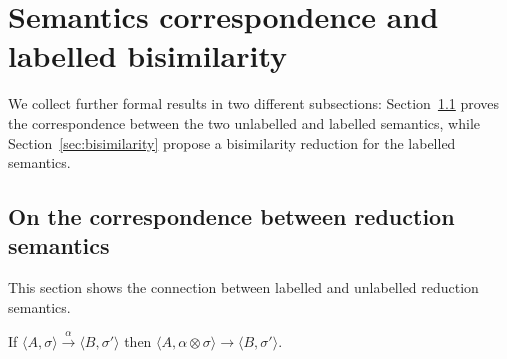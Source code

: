 \documentclass{llncs}
\def\C{{\mathcal C}}
\def\C{{\mathcal C}}
\def\odiv{\, {\ominus\hspace{-7.7pt} \div} \,}
\begin{document}
\section{Semantics correspondence and labelled bisimilarity}\label{sec:correspondancebis}
We collect further formal results in two different subsections: Section~\ref{sec:corres} proves the correspondence between the two unlabelled and labelled semantics, while Section~\ref{sec:bisimilarity} propose a bisimilarity reduction for the labelled  semantics.

\subsection{On the correspondence between reduction semantics}
\label{sec:corres}
This section shows the connection between labelled and unlabelled reduction semantics.
%

\begin{theorem}[Soundness]
\label{sound}
If $\langle A, \sigma \rangle \xrightarrow{\alpha} \langle B, \sigma' \rangle$
then %
$\langle A, \alpha \otimes \sigma \rangle \to \langle B, \sigma' \rangle$.
\end{theorem}
%	
\end{document}
